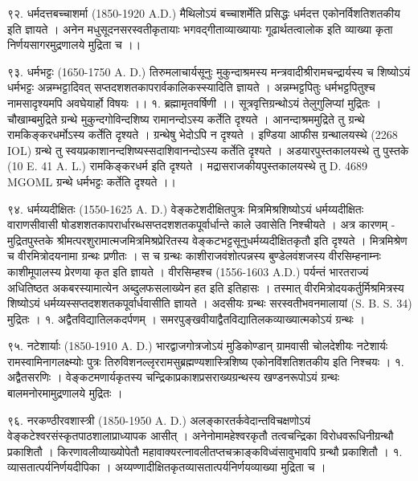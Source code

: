 ९२. धर्मदत्तबच्चाशर्मा (1850-1920 A.D.)
मैथिलोऽयं बच्चाशर्मेति प्रसिद्धः धर्मदत्त एकोनर्विशतिशतकीय इति ज्ञायते । अनेन मधुसूदनसरस्वतीकृतायाः भगवद्गीताव्याख्यायाः गूढार्थतत्वालोक इति व्याख्या कृता निर्णयसागरमुद्रणालये मुद्रिता च ।।

९३. धर्मभट्टः (1650-1750 A. D.)
तिरुमलाचार्यसूनुः मुकुन्दाश्रमस्य मन्त्रवादीश्रीरामचन्द्रार्यस्य च शिष्योऽयं धर्मभट्टः अन्नम्भट्टादिवत् सप्तदशशतकापरार्वकालिकस्स्यादिति ज्ञायते । अन्नम्भट्टपितुः धर्मभट्टपितुश्च नामसादृश्यमपि अवघेयार्हो विषयः ।।
१. ब्रह्मामृतवर्षिणी ।। सूत्रवृत्तिग्रन्थोऽयं तेलुगुलिप्यां मुद्रितः । चौखाम्बमुद्रिते ग्रन्थे मुकुन्दगोविन्दशिष्य रामानन्दोऽस्य कर्तेति दृश्यते । आनन्दाश्रममुद्रिते तु ग्रन्थे रामकिङ्करधर्मोऽस्य कर्तेति दृश्यते । ग्रन्थेषु भेदोऽपि न दृश्यते । इण्डिया आफीस ग्रन्थालयस्थे (2268 IOL) ग्रन्थे तु स्वयप्रकाशानन्दशिष्यस्सदाशिवानन्दोऽस्य कर्तेति दृश्यते । अडयारपुस्तकालयस्थे तु पुस्तके (10 E. 41 A. L.) रामकिङ्करधर्म इति दृश्यते । मद्रासराजकीयपुस्तकालयस्थे तु D. 4689 MGOML ग्रन्थे धर्मभट्टः कर्तेति दृश्यते ।।

९४. धर्मय्यदीक्षितः (1550-1625 A. D.)
वेङ्कटेशदीक्षितपुत्रः मित्रमिश्रशिष्योऽयं धर्मय्यदीक्षितः वाराणसीवासी षोडशशतकापरार्धारब्धसप्तदशशतकपूर्वार्धान्ते काले उवासेति निश्चीयते । अत्र कारणम् - मुद्रितपुस्तके श्रीमत्परशुरामात्मजमित्रमिश्रप्रेरितस्य वेङ्कटभट्टसूनुधर्मय्यदीक्षितकृतौ इति दृश्यते । मित्रमिश्रेण च वीरमित्रोदयनामा ग्रन्थः प्रणीतः । स च ग्रन्थः काशीराजवंशोत्पन्नस्य बुण्डेलवंशजस्य वीरसिम्हनाम्नः काशीमूपालस्य प्रेरणया कृत इति ज्ञायते । वीरसिम्हश्च (1556-1603 A.D.) पर्यन्तं भारतराज्यं अधितिष्ठत अकबरस्यामात्येन अब्दुलफसलाख्येन हत इति इतिहासः । तस्मात् वीरमित्रोदयकर्तुर्मिश्रमित्रस्य शिष्योऽयं धर्मय्यस्सप्तदशशतकपूर्वार्धवासीति ज्ञायते । अदसीयः ग्रन्थः सरस्वतीभवनमालायां (S. B. S. 34) मुद्रितः ।
१. अद्वैतविद्यातिलकदर्पणम् ।  समरपुङ्खवीयाद्वैतविद्यातिलकव्याख्यात्मकोऽयं ग्रन्थः ।

९५. नटेशार्याः (1850-1910 A. D.)
भारद्वाजगोत्रजोऽयं मुडिकोण्डान् ग्रामवासी चोलदेशीयः नटेशार्यः रामस्वामिनागलक्ष्म्योः पुत्रः तिरुविशनल्लृररामसुब्रह्मण्यशास्त्रिशिष्य एकोनविंशतिशतकीय इति निश्चयः । 
१. अद्वैतसरणिः । वेङ्कटमणार्यकृतस्य चन्द्रिकाप्रकाशप्रसराख्यग्रन्थस्य खण्डनरूपोऽयं ग्रन्थः बालमनोरमामुद्रणालये मुद्रितः ।

९६. नरकण्ठीरवशास्त्री (1850-1950 A. D.)
अलङ्कारतर्कवेदान्तविचक्षणोऽयं वेङ्कटेश्वरसंस्कृतपाठशालाप्राध्यापक आसीत् । अनेनोमामहेश्वरकृतौ तत्वचन्द्रिका विरोधवरूधिनीग्रन्थौ प्रकाशितौ । किरणावलीव्याख्योपेतौ महावाक्यरत्नावलीतप्तचक्राङ्कविध्वंसावुभावपि ग्रन्थौ प्रकाशितौ ।
१. व्यासतात्पर्यनिर्णयदीपिका । अय्यण्णादीक्षितकृतव्यासतात्पर्यनिर्णयव्याख्या मुद्रिता च ।


